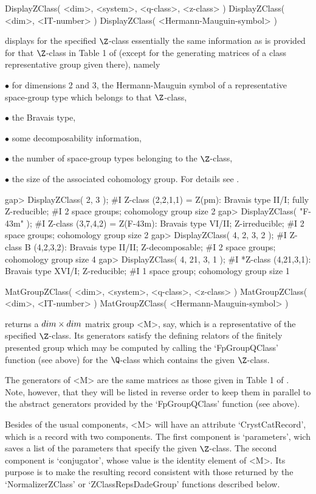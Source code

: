 \>DisplayZClass( <dim>, <system>, <q-class>, <z-class> )
\>DisplayZClass( <dim>, <IT-number> )
\>DisplayZClass( <Hermann-Mauguin-symbol> )

displays for the specified $\Z$-class essentially the same information
as is provided for that $\Z$-class in Table 1 of \cite{BBNWZ78}
(except for the generating matrices of a class representative group
given there), namely
\beginlist
\item{$\bullet$} for  dimensions 2 and 3, the  Hermann-Mauguin symbol of a
    representative space-group type  which belongs  to that $\Z$-class,
\item{$\bullet$} the Bravais type,
\item{$\bullet$} some decomposability information,
\item{$\bullet$} the number of space-group types belonging to the $\Z$-class,
\item{$\bullet$} the size of the associated cohomology group.
\endlist
For details see \cite{BBNWZ78}.

\beginexample
gap> DisplayZClass( 2, 3 );
#I    Z-class (2,2,1,1) = Z(pm): Bravais type II/I; fully Z-reducible;
#I     2 space groups; cohomology group size 2
gap> DisplayZClass( "F-43m" );
#I    Z-class (3,7,4,2) = Z(F-43m): Bravais type VI/II; Z-irreducible;
#I     2 space groups; cohomology group size 2
gap> DisplayZClass( 4, 2, 3, 2 );
#I    Z-class B (4,2,3,2): Bravais type II/II; Z-decomposable;
#I     2 space groups; cohomology group size 4
gap> DisplayZClass( 4, 21, 3, 1 );
#I   *Z-class (4,21,3,1): Bravais type XVI/I; Z-reducible;
#I     1 space group; cohomology group size 1
\endexample

\>MatGroupZClass( <dim>, <system>, <q-class>, <z-class> )
\>MatGroupZClass( <dim>, <IT-number> )
\>MatGroupZClass( <Hermann-Mauguin-symbol> )

returns a $dim \times dim$ matrix group <M>, say, which is a
representative of the specified $\Z$-class.  Its generators satisfy
the defining relators of the finitely presented group which may be
computed by calling the `FpGroupQClass' function (see above) for the
$\Q$-class which contains the given $\Z$-class.

The generators of <M> are the same matrices as those given  in Table 1 of
\cite{BBNWZ78}. Note, however, that they will  be listed in reverse order
to  keep them  in parallel  to  the abstract  generators provided by  the
`FpGroupQClass' function (see above).

Besides of the usual components, <M> will have an attribute
`CrystCatRecord', which is a record with two components.  The
first component is `parameters', wich saves a list of the parameters
that specify the given $\Z$-class. The second component is
`conjugator', whose value is the identity element of <M>. Its purpose
is to make the resulting record consistent with those returned by
the `NormalizerZClass' or `ZClassRepsDadeGroup' functions described
below.

